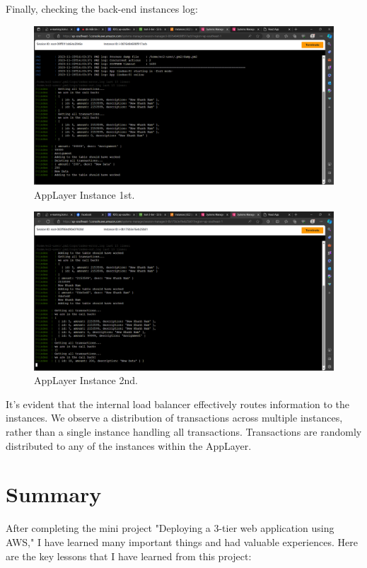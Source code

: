 \documentclass{article}
\begin{document}
Finally, checking the back-end instances log:\par
\begin{figure}[h]
    \centering
    \includegraphics[width=12cm]{Pictures/Internet/AppIns_1.png}
    \caption{AppLayer Instance 1st.}
    \label{fig:enter-label}
\end{figure}

\begin{figure}[h]
    \centering
    \includegraphics[width=12cm]{Pictures/Internet/AppIns_2.png}
    \caption{AppLayer Instance 2nd.}
    \label{fig:enter-label}
\end{figure}

It's evident that the internal load balancer effectively routes information to the instances. We observe a distribution of transactions across multiple instances, rather than a single instance handling all transactions. Transactions are randomly distributed to any of the instances within the AppLayer.

\newpage
\section{Summary}
After completing the mini project "Deploying a 3-tier web application using AWS," I have learned many important things and had valuable experiences. Here are the key lessons that I have learned from this project:\par
\end{document}
